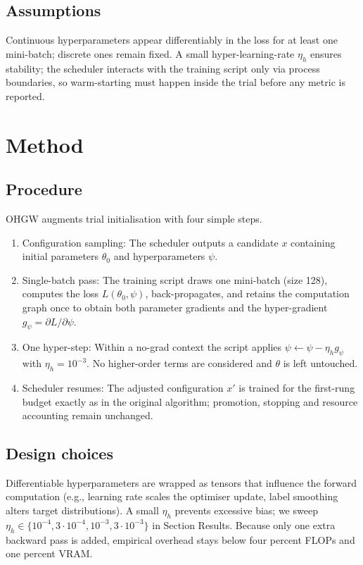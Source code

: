 \documentclass{article} %
\begin{document}
\subsection{Assumptions}
Continuous hyperparameters appear differentiably in the loss for at least one mini-batch; discrete ones remain fixed. A small hyper-learning-rate \(\eta_h\) ensures stability; the scheduler interacts with the training script only via process boundaries, so warm-starting must happen inside the trial before any metric is reported.

\section{Method}
\label{sec:method}
\subsection{Procedure}
OHGW augments trial initialisation with four simple steps.
\begin{enumerate}
  \item Configuration sampling: The scheduler outputs a candidate \(x\) containing initial parameters \(\theta_0\) and hyperparameters \(\psi\).
  \item Single-batch pass: The training script draws one mini-batch (size 128), computes the loss \(L(\theta_0,\psi)\), back-propagates, and retains the computation graph once to obtain both parameter gradients and the hyper-gradient \(g_{\psi} = \partial L/\partial \psi\).
  \item One hyper-step: Within a no-grad context the script applies \(\psi \leftarrow \psi - \eta_h g_{\psi}\) with \(\eta_h = 10^{-3}\). No higher-order terms are considered and \(\theta\) is left untouched.
  \item Scheduler resumes: The adjusted configuration \(x'\) is trained for the first-rung budget exactly as in the original algorithm; promotion, stopping and resource accounting remain unchanged.
\end{enumerate}

\subsection{Design choices}
Differentiable hyperparameters are wrapped as tensors that influence the forward computation (e.g., learning rate scales the optimiser update, label smoothing alters target distributions). A small \(\eta_h\) prevents excessive bias; we sweep \(\eta_h\in\{10^{-4}, 3\cdot10^{-4}, 10^{-3}, 3\cdot10^{-3}\}\) in Section Results. Because only one extra backward pass is added, empirical overhead stays below four percent FLOPs and one percent VRAM.
\end{document}
